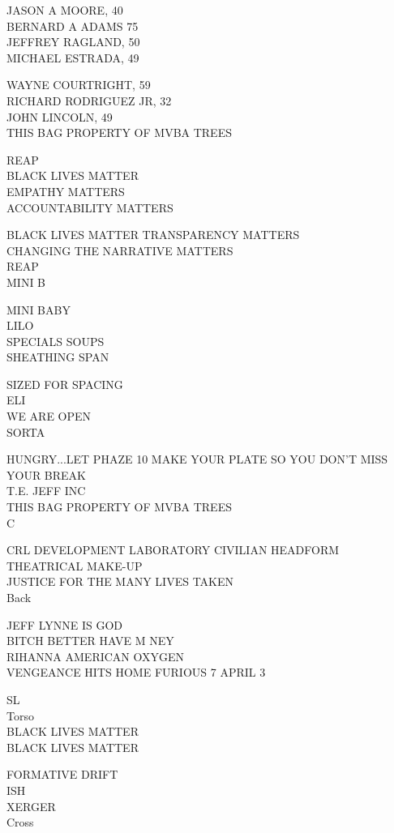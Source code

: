 \documentclass[10pt,letterpaper]{article}
\begin{document}
JASON A MOORE, 40\\
BERNARD A ADAMS 75\\
JEFFREY RAGLAND, 50\\
MICHAEL ESTRADA, 49

WAYNE COURTRIGHT, 59\\
RICHARD RODRIGUEZ JR, 32\\
JOHN LINCOLN, 49\\
THIS BAG PROPERTY OF MVBA TREES

REAP\\
BLACK LIVES MATTER\\
EMPATHY MATTERS\\
ACCOUNTABILITY MATTERS

BLACK LIVES MATTER TRANSPARENCY MATTERS\\
CHANGING THE NARRATIVE MATTERS\\
REAP\\
MINI B

MINI BABY\\
LILO\\
SPECIALS SOUPS\\
SHEATHING SPAN

SIZED FOR SPACING\\
ELI\\
WE ARE OPEN\\
SORTA

HUNGRY...LET PHAZE 10 MAKE YOUR PLATE SO YOU DON'T MISS YOUR BREAK\\
T.E. JEFF INC\\
THIS BAG PROPERTY OF MVBA TREES\\
C

CRL DEVELOPMENT LABORATORY CIVILIAN HEADFORM\\
THEATRICAL MAKE{-}UP\\
JUSTICE FOR THE MANY LIVES TAKEN\\
Back

JEFF LYNNE IS GOD\\
BITCH BETTER HAVE M NEY\\
RIHANNA AMERICAN OXYGEN\\
VENGEANCE HITS HOME FURIOUS 7 APRIL 3

SL\\
Torso\\
BLACK LIVES MATTER\\
BLACK LIVES MATTER

FORMATIVE DRIFT\\
ISH\\
XERGER\\
Cross
\end{document}
